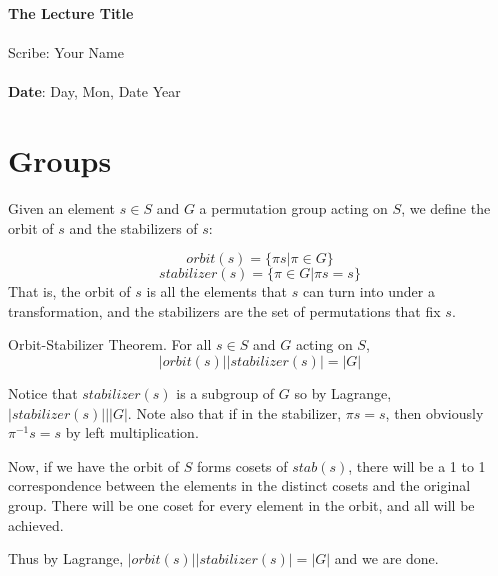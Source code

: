 \documentclass[11pt,twosided]{article}
\def\titlestring{The Lecture Title}
\def\scribestring{Your Name}
\def\datestring{Day, Mon, Date Year}
\begin{document}
\thispagestyle{plain}  %

\noindent
{\LARGE \textbf{\titlestring}}\\\\
%
{\Large Scribe: \scribestring}\\ \\
{\textbf{Date}: \datestring}


\noindent



\section{Groups}
Given an element $s \in S$ and $G$ a permutation group acting on $S$, we define the orbit of $s$ and the stabilizers of $s$: 

\[
	orbit(s) = \{ \pi s | \pi \in G \} 
\]
\[
	stabilizer(s) = \{ \pi \in G | \pi s = s \}
\]
That is, the orbit of $s$ is all the elements that $s$ can turn into under a transformation, and the stabilizers are the set of permutations that fix $s$. 

\begin{theorem}
Orbit-Stabilizer Theorem. For all $s \in S$ and $G$ acting on $S$, 
\[
	|orbit(s)| |stabilizer(s)| = |G|
\]
\end{theorem}

Notice that $stabilizer(s)$ is a subgroup of $G$ so by Lagrange, $|stabilizer(s)| \big| |G|$. Note also that if in the stabilizer, $\pi s = s$, then obviously $\pi^{-1} s = s$ by left multiplication. 

Now, if we have the orbit of $S$ forms cosets of $stab(s)$, there will be a 1 to 1 correspondence between the elements in the distinct cosets and the original group. There will be one coset for every element in the orbit, and all will be achieved. 

Thus by Lagrange, $|orbit(s)| |stabilizer(s)| = |G|$ and we are done. 
\end{document}
